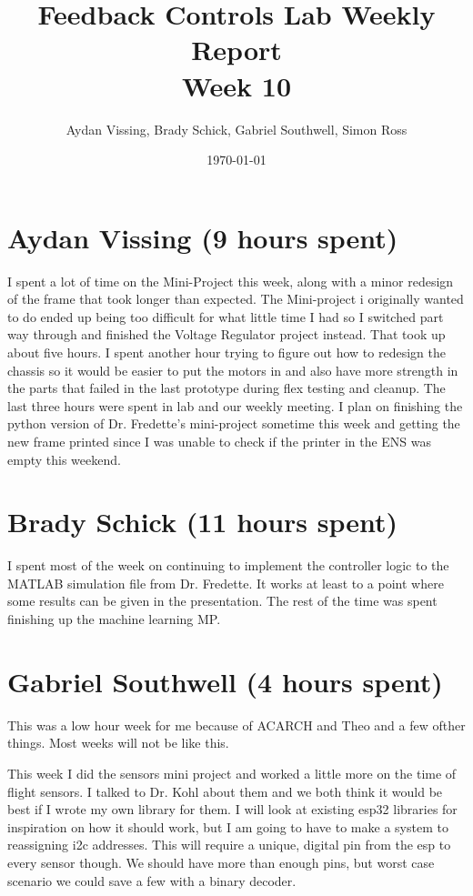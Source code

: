 \documentclass[12pt, titlepage]{article}
\title{Feedback Controls Lab Weekly Report \\ \normalsize{Week 10}}
\author{Aydan Vissing, Brady Schick, Gabriel Southwell, Simon Ross}
\date{\today}
\begin{document}
\maketitle

\section*{Aydan Vissing (9 hours spent)}

I spent a lot of time on the Mini-Project this week, along with a minor redesign of the frame that took longer than expected. The Mini-project i originally wanted to do ended up being too difficult for what little time I had so I switched part way through and finished the Voltage Regulator project instead. That took up about five hours. I spent another hour trying to figure out how to redesign the chassis so it would be easier to put the motors in and also have more strength in the parts that failed in the last prototype during flex testing and cleanup. The last three hours were spent in lab and our weekly meeting. I plan on finishing the python version of Dr. Fredette's mini-project sometime this week and getting the new frame printed since I was unable to check if the printer in the ENS was empty this weekend. 

\section*{Brady Schick (11 hours spent)}

I spent most of the week on continuing to implement the controller logic to the MATLAB simulation file from Dr. Fredette. It works at least to a point where some results can be given in the presentation. The rest of the time was spent finishing up the machine learning MP.

\section*{Gabriel Southwell (4 hours spent)}

This was a low hour week for me because of ACARCH and Theo and a few ofther things. Most weeks will not be like this.

This week I did the sensors mini project and worked a little more on the time of flight sensors. I talked to Dr. Kohl about them and we both think it would be best if I wrote my own library for them. I will look at existing esp32 libraries for inspiration on how it should work, but I am going to have to make a system to reassigning i2c addresses. This will require a unique, digital pin from the esp to every sensor though. We should have more than enough pins, but worst case scenario we could save a few with a binary decoder. 
\end{document}
